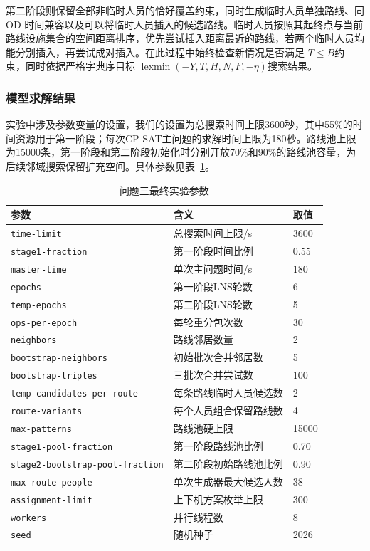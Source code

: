 \documentclass[UTF-8,a4paper,zihao=-4]{ctexart}
\begin{document}
第二阶段则保留全部非临时人员的恰好覆盖约束，同时生成临时人员单独路线、同 OD 时间兼容以及可以将临时人员插入的候选路线。临时人员按照其起终点与当前路线设施集合的空间距离排序，优先尝试插入距离最近的路线，若两个临时人员均能分别插入，再尝试成对插入。在此过程中始终检查新情况是否满足 $T\leq B$约束，同时依据严格字典序目标 $\operatorname{lexmin}(-Y,T,H,N,F,-\eta)$搜索结果。

\subsubsection{模型求解结果}

实验中涉及参数变量的设置，我们的设置为总搜索时间上限3600秒，其中55\%的时间资源用于第一阶段；每次CP-SAT主问题的求解时间上限为180秒。路线池上限为15000条，第一阶段和第二阶段初始化时分别开放70\%和90\%的路线池容量，为后续邻域搜索保留扩充空间。具体参数见表~\ref{tab:q3-parameters}。


\begin{table}[H]

\centering
\caption{问题三最终实验参数}
\label{tab:q3-parameters}
\small

\begin{tabular}{lll}

\toprule
参数 & 含义 & 取值 \\
\midrule
\texttt{time-limit} & 总搜索时间上限/s & 3600 \\
\texttt{stage1-fraction} & 第一阶段时间比例 & 0.55 \\
\texttt{master-time} & 单次主问题时间/s & 180 \\
\texttt{epochs} & 第一阶段LNS轮数 & 6 \\
\texttt{temp-epochs} & 第二阶段LNS轮数 & 5 \\
\texttt{ops-per-epoch} & 每轮重分包次数 & 30 \\
\texttt{neighbors} & 路线邻居数量 & 2 \\
\texttt{bootstrap-neighbors} & 初始批次合并邻居数 & 5 \\
\texttt{bootstrap-triples} & 三批次合并尝试数 & 100 \\
\texttt{temp-candidates-per-route} & 每条路线临时人员候选数 & 2 \\
\texttt{route-variants} & 每个人员组合保留路线数 & 4 \\
\texttt{max-patterns} & 路线池硬上限 & 15000 \\
\texttt{stage1-pool-fraction} & 第一阶段路线池比例 & 0.70 \\
\texttt{stage2-bootstrap-pool-fraction} & 第二阶段初始路线池比例 & 0.90 \\
\texttt{max-route-people} & 单次生成器最大候选人数 & 38 \\
\texttt{assignment-limit} & 上下机方案枚举上限 & 300 \\
\texttt{workers} & 并行线程数 & 8 \\
\texttt{seed} & 随机种子 & 2026 \\
\bottomrule

\end{tabular}

\end{table}
\end{document}
